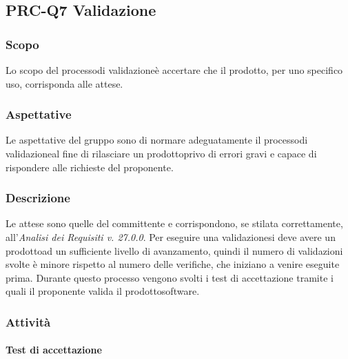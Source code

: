 \subsection{PRC-Q7 Validazione}

	\subsubsection{Scopo}
	Lo scopo del processo\glosp di validazione\glosp è accertare che il prodotto\glo, per uno specifico uso, corrisponda alle attese.
	
	\subsubsection{Aspettative}
	Le aspettative del gruppo sono di normare adeguatamente il processo\glosp di validazione\glosp al fine di rilasciare un prodotto\glosp privo di errori gravi e capace di rispondere alle richieste del proponente.
	
	\subsubsection{Descrizione}
	Le attese sono quelle del committente e corrispondono, se stilata correttamente, all'\textit{Analisi dei Requisiti v. 27.0.0}. 
	Per eseguire una validazione\glosp si deve avere un prodotto\glosp ad un sufficiente livello di avanzamento, quindi il numero di validazioni svolte è minore rispetto al numero delle verifiche, che iniziano a venire eseguite prima.
	Durante questo processo vengono svolti i test di accettazione tramite i quali il proponente valida il prodotto\glosp software.
	
	\subsubsection{Attività}
		\paragraph{Test di accettazione}
